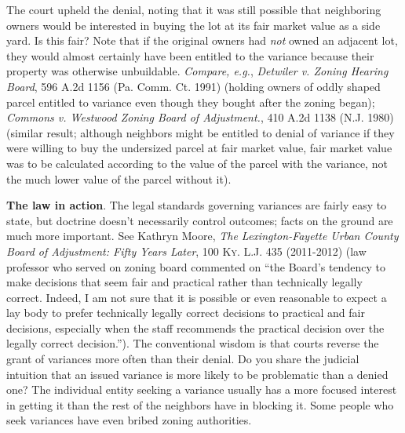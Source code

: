 The court upheld the denial, noting that it was still possible that neighboring
owners would be interested in buying the lot at its fair market value as a side
yard. Is this fair? Note that if the original owners had \textit{not} owned an
adjacent lot, they would almost certainly have been entitled to the variance
because their property was otherwise unbuildable. \textit{Compare, e.g.},
\emph{Detwiler v. Zoning Hearing Board}, 596 A.2d 1156 (Pa. Comm. Ct. 1991)
(holding owners of oddly shaped parcel entitled to variance even though they
bought after the zoning began); \emph{Commons v. Westwood Zoning Board of
Adjustment.}, 410 A.2d 1138 (N.J. 1980) (similar result; although neighbors
might be entitled to denial of variance if they were willing to buy the
undersized parcel at fair market value, fair market value was to be calculated
according to the value of the parcel with the variance, not the much lower value
of the parcel without it).

\item
\textbf{The law in action}. The legal standards governing variances are fairly
easy to state, but doctrine doesn't necessarily control outcomes; facts on the
ground are much more important. See Kathryn Moore, \textit{The Lexington-Fayette
Urban County Board of Adjustment: Fifty Years Later}, 100 \textsc{Ky. L.J.} 435
(2011-2012) (law professor who served on zoning board commented on ``the Board's
tendency to make decisions that seem fair and practical rather than technically
legally correct. Indeed, I am not sure that it is possible or even reasonable to
expect a lay body to prefer technically legally correct decisions to practical
and fair decisions, especially when the staff recommends the practical decision
over the legally correct decision.''). The conventional wisdom is that courts
reverse the grant of variances more often than their denial. Do you share the
judicial intuition that an issued variance is more likely to be problematic than
a denied one? The individual entity seeking a variance usually has a more
focused interest in getting it than the rest of the neighbors have in blocking
it. Some people who seek variances have even bribed zoning authorities.

